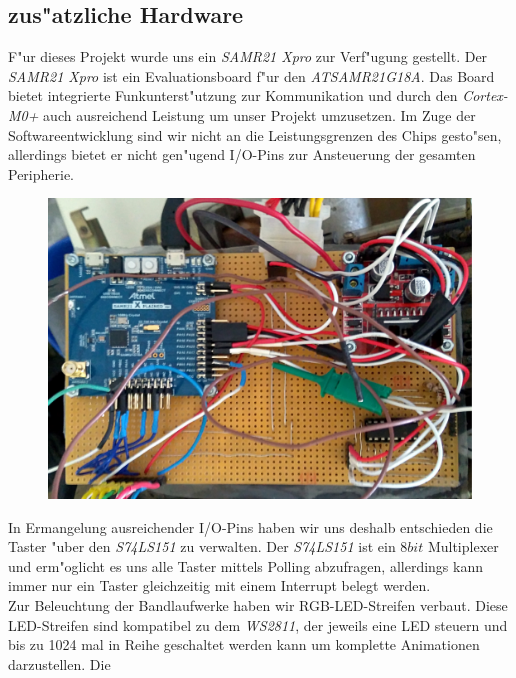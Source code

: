 \documentclass[a4paper]{article}
\begin{document}
  \subsection{zus"atzliche Hardware}
    \label{sec:hardware_additional}
    F"ur dieses Projekt wurde uns ein \textit{SAMR21 Xpro} zur Verf"ugung
    gestellt. Der \textit{SAMR21 Xpro} ist ein Evaluationsboard f"ur den
    \textit{ATSAMR21G18A}. Das Board bietet integrierte Funkunterst"utzung zur
    Kommunikation und durch den \textit{Cortex-M0+} auch ausreichend Leistung
    um unser Projekt umzusetzen. Im Zuge der Softwareentwicklung sind wir nicht
    an die Leistungsgrenzen des Chips gesto"sen, allerdings bietet er nicht
    gen"ugend I/O-Pins zur Ansteuerung der gesamten Peripherie.\\
    \begin{figure}
      \centering
      \label{figure:Hardwareplattform}
      \includegraphics[scale=0.05]{Platine.jpg}
    \end{figure}
    In Ermangelung ausreichender I/O-Pins haben wir uns deshalb entschieden die
    Taster "uber den \textit{S74LS151} zu verwalten. Der \textit{S74LS151} ist
    ein \( 8 bit \) Multiplexer und erm"oglicht es uns alle Taster mittels
    Polling abzufragen, allerdings kann immer nur ein Taster gleichzeitig mit
    einem Interrupt belegt werden.\\ Zur Beleuchtung der Bandlaufwerke haben
    wir RGB-LED-Streifen verbaut. Diese LED-Streifen sind kompatibel zu dem
    \textit{WS2811}, der jeweils eine LED steuern und bis zu 1024 mal in Reihe
    geschaltet werden kann um komplette Animationen darzustellen. Die
\end{document}
